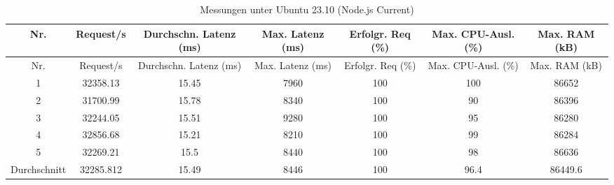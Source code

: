 \begin{landscape}
	\begin{longtable}{
			c
			S[table-format=6.2]
			S[table-format=2.2]
			S[table-format=3.0]
			S[table-format=3]
			S[table-format=2.0]
			S[table-format=5.1]
		}
		\caption{Messungen unter Ubuntu 23.10 (Node.js Current)}
		\label{tab:ubuntu-nodejs-current} \\
		\toprule
		Nr. & {Request/s} & {Durchschn. Latenz (ms)} & {Max. Latenz (ms)} & {Erfolgr. Req (\%)} & {Max. CPU-Ausl. (\%)} & {Max. RAM (kB)} \\
		\midrule
		\endfirsthead
		\toprule
		Nr. & {Request/s} & {Durchschn. Latenz (ms)} & {Max. Latenz (ms)} & {Erfolgr. Req (\%)} & {Max. CPU-Ausl. (\%)} & {Max. RAM (kB)} \\
		\midrule
		 & 32358.13 & 15.45 & 7960 & 100 & 100 & 86652 \\
		2 & 31700.99 & 15.78 & 8340 & 100 & 90 & 86396 \\
		3 & 32244.05 & 15.51 & 9280 & 100 & 95 & 86280 \\
		4 & 32856.68 & 15.21 & 8210 & 100 & 99 & 86284 \\
		5 & 32269.21 & 15.5 & 8440 & 100 & 98 & 86636 \\
		Durchschnitt & 32285.812 & 15.49 & 8446 & 100 & 96.4 & 86449.6 \\
		\bottomrule
	\end{longtable}
	
\end{landscape}

